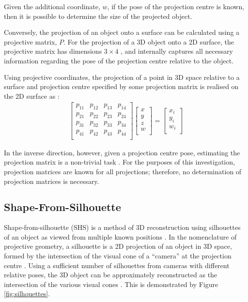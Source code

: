Given the additional coordinate, $w$, if the pose of the projection centre is known, then it is possible to determine the size of the projected object.

Conversely, the projection of an object onto a surface can be calculated using a projective matrix, $P$. For the projection of a 3D object onto a 2D surface, the projective matrix has dimensions $3\times4$ \cite{lovell_2023b}, and internally captures all necessary information regarding the pose of the projection centre relative to the object.

Using projective coordinates, the projection of a point in 3D space relative to a surface and projection centre specified by some projection matrix is realised on the 2D surface as \cite{lovell_2023b}:
\begin{align}
  \begin{bmatrix}
    p_{11} & p_{12} & p_{13} & p_{14} \\
    p_{21} & p_{22} & p_{23} & p_{24} \\
    p_{31} & p_{32} & p_{33} & p_{34} \\
    p_{41} & p_{42} & p_{43} & p_{44} \\
  \end{bmatrix}
  \begin{bmatrix}
    x \\
    y \\
    z \\
    w \\
  \end{bmatrix}
  =
  \begin{bmatrix}
    x_i \\
    y_i \\
    w_i \\
  \end{bmatrix}
\end{align}

In the inverse direction, however, given a projection centre pose, estimating the projection matrix is a non-trivial task \cite{lovell_2023b}. For the purposes of this investigation, projection matrices are known for all projections; therefore, no determination of projection matrices is necessary.

\newpage
\subsection{Shape-From-Silhouette}

Shape-from-silhouette (SHS) is a method of 3D reconstruction using silhouettes of an object as viewed from multiple known positions \cite{lovell_2023b}. In the nomenclature of projective geometry, a silhouette is a 2D projection of an object in 3D space, formed by the intersection of the visual cone of a ``camera'' at the projection centre \cite{cheung_2005}. Using a sufficient number of silhouettes from cameras with different relative poses, the 3D object can be approximately reconstructed as the intersection of the various visual cones \cite{lovell_2023b}. This is demonstrated by Figure \ref{fig:silhouettes}.

